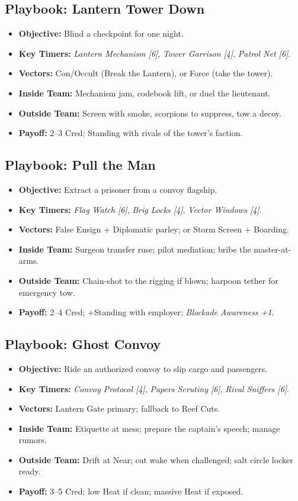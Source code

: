 \documentclass[11pt,oneside]{book}
\begin{document}
\subsection*{Playbook: Lantern Tower Down}
\begin{itemize}
  \item \textbf{Objective:} Blind a checkpoint for one night.
  \item \textbf{Key Timers:} \emph{Lantern Mechanism [6]}, \emph{Tower Garrison [4]}, \emph{Patrol Net [6]}.
  \item \textbf{Vectors:} Con/Occult (Break the Lantern), or Force (take the tower).
  \item \textbf{Inside Team:} Mechanism jam, codebook lift, or duel the lieutenant.
  \item \textbf{Outside Team:} Screen with smoke, scorpions to suppress, tow a decoy.
  \item \textbf{Payoff:} 2--3 Cred; Standing with rivals of the tower's faction.
\end{itemize}

\subsection*{Playbook: Pull the Man}
\begin{itemize}
  \item \textbf{Objective:} Extract a prisoner from a convoy flagship.
  \item \textbf{Key Timers:} \emph{Flag Watch [6]}, \emph{Brig Locks [4]}, \emph{Vector Windows [4]}.
  \item \textbf{Vectors:} False Ensign + Diplomatic parley; or Storm Screen + Boarding.
  \item \textbf{Inside Team:} Surgeon transfer ruse; pilot mediation; bribe the master-at-arms.
  \item \textbf{Outside Team:} Chain-shot to the rigging if blown; harpoon tether for emergency tow.
  \item \textbf{Payoff:} 2--4 Cred; +Standing with employer; \emph{Blockade Awareness +1}.
\end{itemize}

\subsection*{Playbook: Ghost Convoy}
\begin{itemize}
  \item \textbf{Objective:} Ride an authorized convoy to slip cargo and passengers.
  \item \textbf{Key Timers:} \emph{Convoy Protocol [4]}, \emph{Papers Scrutiny [6]}, \emph{Rival Sniffers [6]}.
  \item \textbf{Vectors:} Lantern Gate primary; fallback to Reef Cuts.
  \item \textbf{Inside Team:} Etiquette at mess; prepare the captain's speech; manage rumors.
  \item \textbf{Outside Team:} Drift at Near; cut wake when challenged; salt circle locker ready.
  \item \textbf{Payoff:} 3--5 Cred; low Heat if clean; massive Heat if exposed.
\end{itemize}
\end{document}
